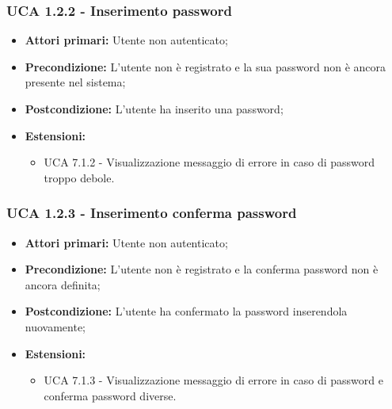 \subsubsection{UCA 1.2.2 - Inserimento password}%
\begin{itemize}
\item \textbf{Attori primari:} Utente non autenticato;
\item \textbf{Precondizione:} L'utente non è registrato e la sua password non è ancora presente nel sistema;
\item \textbf{Postcondizione:} L'utente ha inserito una password;
\item \textbf{Estensioni:}
	\begin{itemize}
		\item UCA 7.1.2 - Visualizzazione messaggio di errore in caso di password troppo debole.
	\end{itemize}
\end{itemize}

\subsubsection{UCA 1.2.3 - Inserimento conferma password}%
\begin{itemize}
\item \textbf{Attori primari:} Utente non autenticato;
\item \textbf{Precondizione:} L'utente non è registrato e la conferma password non è ancora definita;
\item \textbf{Postcondizione:} L'utente ha confermato la password inserendola nuovamente;
\item \textbf{Estensioni:}
	\begin{itemize}
		\item UCA 7.1.3 - Visualizzazione messaggio di errore in caso di password e conferma password diverse.
	\end{itemize}
\end{itemize}